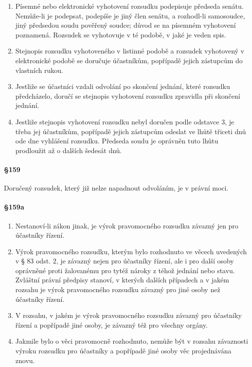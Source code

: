\begin{enumerate}[label={(\arabic*)}]
  \item Písemné nebo elektronické vyhotovení rozsudku podepisuje předseda senátu. Nemůže-li je podepsat, podepíše je jiný člen senátu, a rozhodl-li samosoudce, jiný předsedou soudu pověřený soudce; důvod se na písemném vyhotovení poznamená. Rozsudek se vyhotovuje v té podobě, v jaké je veden spis.
  \item Stejnopis rozsudku vyhotoveného v listinné podobě a rozsudek vyhotovený v elektronické podobě se doručuje účastníkům, popřípadě jejich zástupcům do vlastních rukou.
  \item Jestliže se účastníci vzdali odvolání po skončení jednání, které rozsudku předcházelo, doručí se stejnopis vyhotovení rozsudku zpravidla při skončení jednání.
  \item Jestliže stejnopis vyhotovení rozsudku nebyl doručen podle odstavce 3, je třeba jej účastníkům, popřípadě jejich zástupcům odeslat ve lhůtě třiceti dnů ode dne vyhlášení rozsudku. Předseda soudu je oprávněn tuto lhůtu prodloužit až o dalších šedesát dnů.
\end{enumerate}

\paragraph{\S 159}

Doručený rozsudek, který již nelze napadnout odvoláním, je v právní moci.

\paragraph{\S 159a}

\begin{enumerate}[label={(\arabic*)}]
  \item Nestanoví-li zákon jinak, je výrok pravomocného rozsudku závazný jen pro účastníky řízení.
  \item Výrok pravomocného rozsudku, kterým bylo rozhodnuto ve věcech uvedených v § 83 odst. 2, je závazný nejen pro účastníky řízení, ale i pro další osoby oprávněné proti žalovanému pro tytéž nároky z téhož jednání nebo stavu. Zvláštní právní předpisy stanoví, v kterých dalších případech a v jakém rozsahu je výrok pravomocného rozsudku závazný pro jiné osoby než účastníky řízení.
  \item V rozsahu, v jakém je výrok pravomocného rozsudku závazný pro účastníky řízení a popřípadě jiné osoby, je závazný též pro všechny orgány.
  \item Jakmile bylo o věci pravomocně rozhodnuto, nemůže být v rozsahu závaznosti výroku rozsudku pro účastníky a popřípadě jiné osoby věc projednávána znovu.
\end{enumerate}

